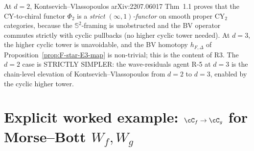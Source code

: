 \begin{remark}[Kontsevich--Vlassopoulos at $d=2$ morphism level]
\label{rem:KV-d2-morphism-level}
At $d = 2$, Kontsevich--Vlassopoulos arXiv:2207.06017 Thm~1.1 proves
that the CY-to-chiral functor $\Phi_2$ is a \emph{strict
$(\infty,1)$-functor} on smooth proper CY$_2$ categories, because the
$\mathbb S^2$-framing is unobstructed and the BV operator commutes
strictly with cyclic pullbacks (no higher cyclic tower needed).  At
$d = 3$, the higher cyclic tower is unavoidable, and the BV homotopy
$h_{F,\Delta}$ of Proposition~\ref{prop:F-star-E3-map} is non-trivial;
this is the content of R3.  The $d = 2$ case is STRICTLY SIMPLER: the
wave-residuals agent R-5 at $d = 3$ is the chain-level elevation of
Kontsevich--Vlassopoulos from $d = 2$ to $d = 3$, enabled by the
cyclic higher tower.
\end{remark}

\section*{Explicit worked example: $\cC_f \to \cC_g$ for Morse--Bott $W_f, W_g$}

